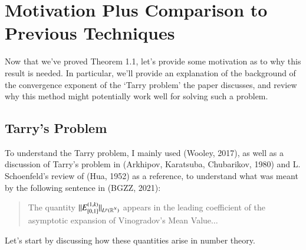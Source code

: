 

\renewcommand\thesection{}



\chapter*{Motivation Plus Comparison to Previous Techniques}

Now that we've proved Theorem 1.1, let's provide some motivation as to why this result is needed. In particular, we'll provide an explanation of the background of the convergence exponent of the `Tarry problem' the paper discusses, and review why this method might potentially work well for solving such a problem.

\section{Tarry's Problem}

To understand the Tarry problem, I mainly used (Wooley, 2017), as well as a discussion of Tarry's problem in (Arkhipov, Karatsuba, Chubarikov, 1980) and L. Schoenfeld's review of (Hua, 1952) as a reference, to understand what was meant by the following sentence in (BGZZ, 2021):
%
\begin{quote}
	The quantity $\| E_{[0,1]}^{(1,k)} \|_{L^p(\operatorname{\mathbb{R}}^N)}$ appears in the leading coefficient of the asymptotic expansion of Vinogradov's Mean Value$\dots$
\end{quote}
%
Let's start by discussing how these quantities arise in number theory.

